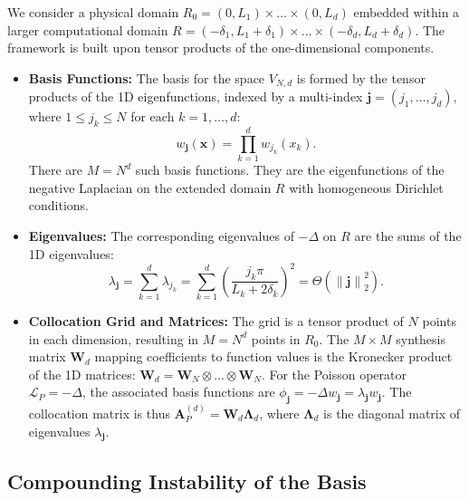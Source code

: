 \documentclass[pdflatex,sn-mathphys-num]{sn-jnl}%
\theoremstyle{thmstyleone}%
\newcommand{\norm}[1]{\left\lVert#1\right\rVert}
\newcommand{\mat}[1]{\mathbf{#1}}
\begin{document}
We consider a physical domain $R_0 = (0, L_1) \times \dots \times (0, L_d)$ embedded within a larger computational domain $R = (-\delta_1, L_1+\delta_1) \times \dots \times (-\delta_d, L_d+\delta_d)$. The framework is built upon tensor products of the one-dimensional components.

\begin{itemize}
    \item \textbf{Basis Functions:} The basis for the space $V_{N,d}$ is formed by the tensor products of the 1D eigenfunctions, indexed by a multi-index $\mathbf{j}=(j_1, \dots, j_d)$, where $1 \le j_k \le N$ for each $k=1,\dots,d$:
    \begin{equation}w_{\mathbf{j}}(\mathbf{x}) = \prod_{k=1}^d w_{j_k}(x_k).\end{equation}
    There are $M=N^d$ such basis functions. They are the eigenfunctions of the negative Laplacian on the extended domain $R$ with homogeneous Dirichlet conditions.
    
    \item \textbf{Eigenvalues:} The corresponding eigenvalues of $-\Delta$ on $R$ are the sums of the 1D eigenvalues:
    \begin{equation}\lambda_{\mathbf{j}} = \sum_{k=1}^d \lambda_{j_k} = \sum_{k=1}^d \left(\frac{j_k\pi}{L_k+2\delta_k}\right)^2 = \Theta(\norm{\mathbf{j}}_2^2).\end{equation}
    
    \item \textbf{Collocation Grid and Matrices:} The grid is a tensor product of $N$ points in each dimension, resulting in $M = N^d$ points in $R_0$. The $M \times M$ synthesis matrix $\mat{W}_d$ mapping coefficients to function values is the Kronecker product of the 1D matrices: $\mat{W}_d = \mat{W}_N \otimes \dots \otimes \mat{W}_N$. For the Poisson operator $\mathcal{L}_P = -\Delta$, the associated basis functions are $\phi_{\mathbf{j}} = -\Delta w_{\mathbf{j}} = \lambda_{\mathbf{j}} w_{\mathbf{j}}$. The collocation matrix is thus $\mat{A}_P^{(d)} = \mat{W}_d \mathbf{\Lambda}_d$, where $\mathbf{\Lambda}_d$ is the diagonal matrix of eigenvalues $\lambda_{\mathbf{j}}$.
\end{itemize}

\subsection{Compounding Instability of the Basis}
\end{document}
